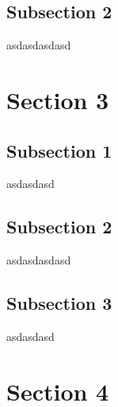 \subsection{Subsection 2}
asdasdasdasd

\section{Section 3}

\subsection{Subsection 1}
asdasdasd

\subsection{Subsection 2}
asdasdasdasd

\subsection{Subsection 3}
asdasdasd

\section{Section 4}

